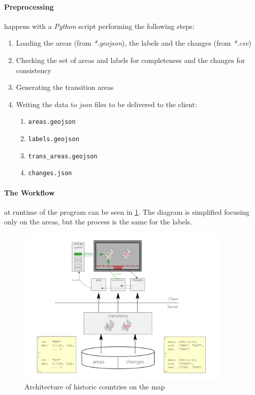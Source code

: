 \vspace{0.5cm}

\paragraph{Preprocessing} happens with a \textit{Python} script performing the following steps:

\begin{enumerate}
  \item Loading the areas (from \textit{*.geojson}), the labels and the changes (from \textit{*.csv})
  \item Checking the set of areas and labels for completeness and the changes for consistency
  \item Generating the transition areas
  \item Writing the data to \textit{json} files to be delivered to the client:
  \begin{enumerate}
    \item \texttt{areas.geojson}
    \item \texttt{labels.geojson}
    \item \texttt{trans\_areas.geojson}
    \item \texttt{changes.json}
  \end{enumerate}
\end{enumerate}

\paragraph{The Workflow}
at runtime of the program can be seen in \ref{fig:historic_changes}. The diagram is simplified focusing only on the areas, but the process is the same for the labels.

\begin{figure}[H]
  \begin{center}
    \includegraphics[width=0.9\textwidth]{graphics/historic_countries.png}
  \end{center}
  \caption{Architecture of historic countries on the map}
  \label{fig:historic_changes}
\end{figure}

